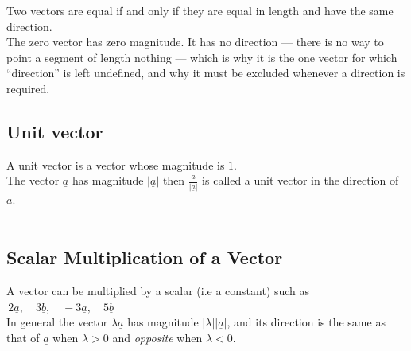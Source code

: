 \documentclass[11pt,a4paper]{article}
\theoremstyle{definition}
\begin{document}
Two vectors are equal if and only if they are equal in length and have the same direction.\\

The zero vector has zero magnitude. It has no direction --- there is no way to
point a segment of length nothing --- which is why it is the one vector for which
``direction'' is left undefined, and why it must be excluded whenever a direction is
required.

\begin{figure}[H]
\centering
{}
\end{figure}












\subsection{Unit vector}
A unit vector is a vector whose magnitude is $1$.\\

The vector $\underline{a}$ has magnitude $\left|\underline{a}\right|$ then $\frac{\underline{a}}{\left|\underline{a}\right|}$ is called a unit vector in the direction of $\underline{a}$.\\\\




\subsection{Scalar Multiplication of a Vector}
A vector can be multiplied by a scalar (i.e a constant) such as $\, 2\underline{a}, \quad  3\underline{b}, \quad  -3\underline{a}, \quad  5\underline{b}$\\

In general the vector $\lambda\underline{a}$ has magnitude
$\left|\lambda\right|\left|\underline{a}\right|$, and its direction is the same as
that of $\underline{a}$ when $\lambda>0$ and \emph{opposite} when $\lambda<0$.
\end{document}

